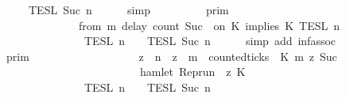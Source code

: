 \begin{isabellebody}
\ \ \ \ \ \ {\isasyminter}\ {\isasymlbrakk}{\isasymlbrakk}\ {\isasymPhi}\ {\isasymrbrakk}{\isasymrbrakk}\isactrlsub T\isactrlsub E\isactrlsub S\isactrlsub L\isactrlbsup {\isasymge}\ Suc\ n\isactrlesup {\isacartoucheclose}\isanewline
\ \ \ \ \isamarkupfalse%
\ simp\isanewline
\ \ \isamarkupfalse%
\ \isamarkupfalse%
\ {\isacartoucheopen}{\isachardot}{\isachardot}{\isachardot}\ {\isacharequal}\ {\isasymlbrakk}{\isasymlbrakk}\ {\isasymGamma}\ {\isasymrbrakk}{\isasymrbrakk}\isactrlsub p\isactrlsub r\isactrlsub i\isactrlsub m\ \isanewline
\ \ \ \ \ \ \ \ \ \ \ \ \ \ \ \ {\isasyminter}\ {\isasymlbrakk}\ {\isacharparenleft}from\ m\ delay\ count\ {\isacharparenleft}Suc\ {}{\isacharparenright}\ on\ K\ implies\ K\ {\isasymrbrakk}\isactrlsub T\isactrlsub E\isactrlsub S\isactrlsub L\isactrlbsup {\isasymge}\ n\isactrlesup \isanewline
\ \ \ \ \ \ \ \ \ \ \ \ \ \ \ \ {\isasyminter}\ {\isasymlbrakk}{\isasymlbrakk}\ {\isasymPsi}\ {\isasymrbrakk}{\isasymrbrakk}\isactrlsub T\isactrlsub E\isactrlsub S\isactrlsub L\isactrlbsup {\isasymge}\ n\isactrlesup \ {\isasyminter}\ {\isasymlbrakk}{\isasymlbrakk}\ {\isasymPhi}\ {\isasymrbrakk}{\isasymrbrakk}\isactrlsub T\isactrlsub E\isactrlsub S\isactrlsub L\isactrlbsup {\isasymge}\ Suc\ n\isactrlesup {\isacartoucheclose}\isanewline
\ \ \ \ \isamarkupfalse%
\ {\isacharparenleft}simp\ add{\isacharcolon}\ inf{\isachardot}assoc{\isacharparenright}\isanewline
\ \ \isamarkupfalse%
\ \isamarkupfalse%
\ {\isacartoucheopen}{\isachardot}{\isachardot}{\isachardot}\ {\isacharequal}\ {\isasymlbrakk}{\isasymlbrakk}\ {\isasymGamma}\ {\isasymrbrakk}{\isasymrbrakk}\isactrlsub p\isactrlsub r\isactrlsub i\isactrlsub m\ \isanewline
\ \ \ \ \ \ \ \ \ \ \ \ \ \ \ \ {\isasyminter}\ {\isacharbraceleft}{\isasymrho}{\isachardot}\ {\isasymforall}z\ {\isasymge}\ n{\isachardot}\ \ {\isacharparenleft}z\ {\isasymge}\ m\ {\isasymand}\ counted{\isacharunderscore}ticks\ {\isasymrho}\ K\ m\ z\ {\isacharparenleft}Suc\ {}{\isacharparenright}{\isacharparenright}\isanewline
\ \ \ \ \ \ \ \ \ \ \ \ \ \ \ \ \ \ \ \ \ \ \ \ \ \ \ \ {\isasymlongrightarrow}\ hamlet\ {\isacharparenleft}{\isacharparenleft}Rep{\isacharunderscore}run\ {\isasymrho}{\isacharparenright}\ z\ K\ {\isacharbraceright}\isanewline
\ \ \ \ \ \ \ \ \ \ \ \ \ \ \ \ {\isasyminter}\ {\isasymlbrakk}{\isasymlbrakk}\ {\isasymPsi}\ {\isasymrbrakk}{\isasymrbrakk}\isactrlsub T\isactrlsub E\isactrlsub S\isactrlsub L\isactrlbsup {\isasymge}\ n\isactrlesup \ {\isasyminter}\ {\isasymlbrakk}{\isasymlbrakk}\ {\isasymPhi}\ {\isasymrbrakk}{\isasymrbrakk}\isactrlsub T\isactrlsub E\isactrlsub S\isactrlsub L\isactrlbsup {\isasymge}\ Suc\ n\isactrlesup {\isacartoucheclose}\isanewline

\end{isabellebody}

